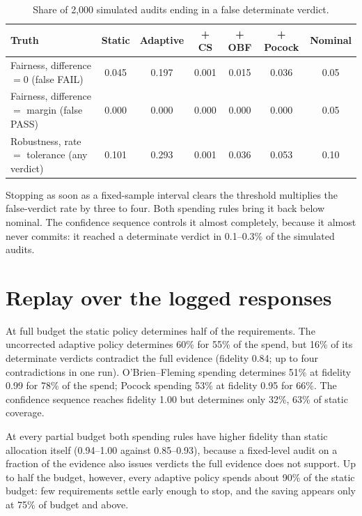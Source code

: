 \begin{table}[H]
\centering
\vspace{1.2em}
\caption{Share of 2{,}000 simulated audits ending in a false determinate verdict.}
\label{tab:nullsim}
\vspace{1.2em}
\footnotesize
\begin{tabular}{@{}lcccccc@{}}
\toprule
Truth & Static & Adaptive & + CS & + OBF & + Pocock & Nominal \\
\midrule
Fairness, difference $=0$ (false FAIL) & 0.045 & 0.197 & 0.001 & 0.015 & 0.036 & 0.05 \\
Fairness, difference $=$ margin (false PASS) & 0.000 & 0.000 & 0.000 & 0.000 & 0.000 & 0.05 \\
Robustness, rate $=$ tolerance (any verdict) & 0.101 & 0.293 & 0.001 & 0.036 & 0.053 & 0.10 \\
\bottomrule
\end{tabular}
\end{table}

Stopping as soon as a fixed-sample interval clears the threshold multiplies the false-verdict rate by three to four. Both spending rules bring it back below nominal. The confidence sequence controls it almost completely, because it almost never commits: it reached a determinate verdict in 0.1--0.3\% of the simulated audits.

\section{Replay over the logged responses}
At full budget the static policy determines half of the requirements. The uncorrected adaptive policy determines 60\% for 55\% of the spend, but 16\% of its determinate verdicts contradict the full evidence (fidelity 0.84; up to four contradictions in one run). O'Brien--Fleming spending determines 51\% at fidelity 0.99 for 78\% of the spend; Pocock spending 53\% at fidelity 0.95 for 66\%. The confidence sequence reaches fidelity 1.00 but determines only 32\%, 63\% of static coverage.

At every partial budget both spending rules have higher fidelity than static allocation itself (0.94--1.00 against 0.85--0.93), because a fixed-level audit on a fraction of the evidence also issues verdicts the full evidence does not support. Up to half the budget, however, every adaptive policy spends about 90\% of the static budget: few requirements settle early enough to stop, and the saving appears only at 75\% of budget and above.

